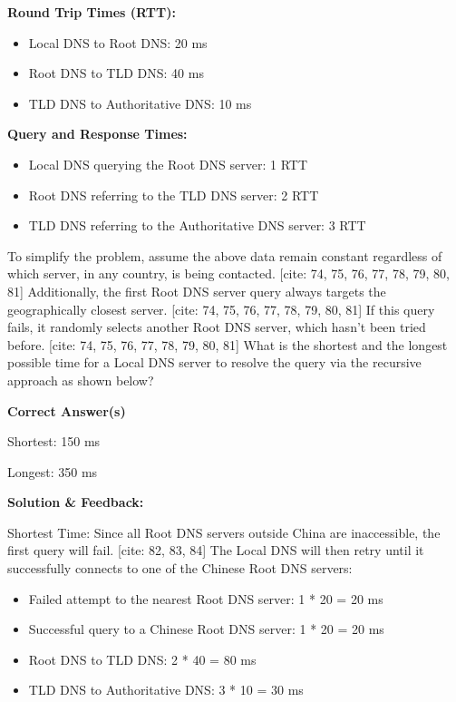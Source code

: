 \textbf{Round Trip Times (RTT):}

\begin{itemize}
    \item Local DNS to Root DNS: 20 ms
    \item Root DNS to TLD DNS: 40 ms
    \item TLD DNS to Authoritative DNS: 10 ms
\end{itemize}

\textbf{Query and Response Times:}

\begin{itemize}
    \item Local DNS querying the Root DNS server: 1 RTT
    \item Root DNS referring to the TLD DNS server: 2 RTT
    \item TLD DNS referring to the Authoritative DNS server: 3 RTT
\end{itemize}

To simplify the problem, assume the above data remain constant 
regardless of which server, in any country, is being contacted. [cite: 74, 75, 76, 77, 78, 79, 80, 81] Additionally, the first Root DNS server query always targets the 
geographically closest server. [cite: 74, 75, 76, 77, 78, 79, 80, 81] If this query fails, it randomly selects 
another Root DNS server, which hasn’t been tried before. [cite: 74, 75, 76, 77, 78, 79, 80, 81] What is the shortest and the longest possible time for a Local DNS server 
to resolve the query via the recursive approach as shown below?

\textbf{Correct Answer(s)}

Shortest: 150 ms

Longest: 350 ms

\textbf{Solution \& Feedback:}

Shortest Time: Since all Root DNS servers outside China are inaccessible, the first 
query will fail. [cite: 82, 83, 84] The Local DNS will then retry until it successfully connects to one of the 
Chinese Root DNS servers:

\begin{itemize}
    \item Failed attempt to the nearest Root DNS server: 1 * 20 = 20 ms
    \item Successful query to a Chinese Root DNS server: 1 * 20 = 20 ms
    \item Root DNS to TLD DNS: 2 * 40 = 80 ms
    \item TLD DNS to Authoritative DNS: 3 * 10 = 30 ms
\end{itemize}

